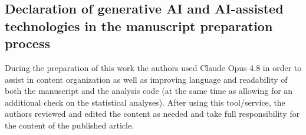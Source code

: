 \documentclass[a4paper, 12pt, fleqn]{article}
\theoremstyle{definition}
\begin{document}
\subsection{Declaration of generative AI and AI-assisted technologies in the manuscript preparation process}
During the preparation of this work the authors used Claude Opus 4.8 in order to assist in content organization as well as improving language and readability of both the manuscript and the analysis code (at the same time as allowing for an additional check on the statistical analyses). After using this tool/service, the authors reviewed and edited the content as needed and take full responsibility for the content of the published article.


\newpage
\thispagestyle{plain}
\addtolength{\topmargin}{-.5cm}
\addtolength{\textheight}{.8cm}



\end{document}
